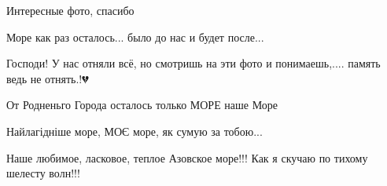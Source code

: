 
Интересные фото, спасибо


Море как раз осталось... было до нас и будет после...


Господи! У нас отняли всё, но смотришь на эти фото и понимаешь,.... память ведь не отнять.!💔


От Родненьго Города осталось только МОРЕ наше Море


Найлагідніше море, МОЄ море, як сумую за тобою...


Наше любимое, ласковое, теплое Азовское море!!! Как я скучаю по тихому шелесту
волн!!!
